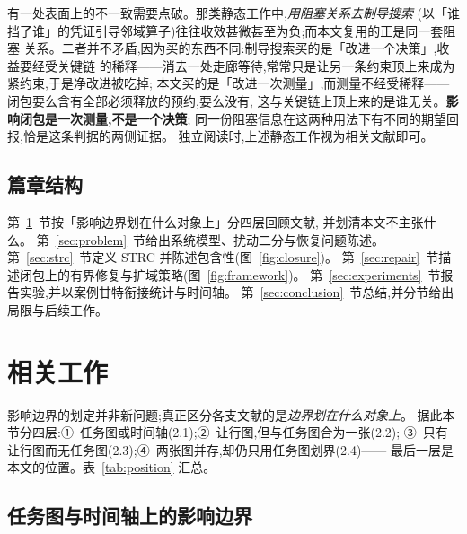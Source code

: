 \documentclass[manuscript,screen,review]{acmart}
\providecommand{\STRC}{\textsc{STRC}}
\begin{document}
有一处表面上的不一致需要点破。那类静态工作中,\emph{用阻塞关系去制导搜索}
(以「谁挡了谁」的凭证引导邻域算子)往往收效甚微甚至为负;而本文复用的正是同一套阻塞
关系。二者并不矛盾,因为买的东西不同:制导搜索买的是「改进一个决策」,收益要经受关键链
的稀释——消去一处走廊等待,常常只是让另一条约束顶上来成为紧约束,于是净改进被吃掉;
本文买的是「改进一次测量」,而测量不经受稀释——闭包要么含有全部必须释放的预约,要么没有,
这与关键链上顶上来的是谁无关。\textbf{影响闭包是一次测量,不是一个决策};
同一份阻塞信息在这两种用法下有不同的期望回报,恰是这条判据的两侧证据。
独立阅读时,上述静态工作视为相关文献即可。

\subsection{篇章结构}

第~\ref{sec:related_work}~节按「影响边界划在什么对象上」分四层回顾文献,
并划清本文不主张什么。
第~\ref{sec:problem}~节给出系统模型、扰动二分与恢复问题陈述。
第~\ref{sec:strc}~节定义 \STRC{} 并陈述包含性(图~\ref{fig:closure})。
第~\ref{sec:repair}~节描述闭包上的有界修复与扩域策略(图~\ref{fig:framework})。
第~\ref{sec:experiments}~节报告实验,并以案例甘特衔接统计与时间轴。
第~\ref{sec:conclusion}~节总结,并分节给出局限与后续工作。

\section{相关工作}
\label{sec:related_work}


影响边界的划定并非新问题;真正区分各支文献的是\emph{边界划在什么对象上}。
据此本节分四层:①~任务图或时间轴(2.1);②~让行图,但与任务图合为一张(2.2);
③~只有让行图而无任务图(2.3);④~两张图并存,却仍只用任务图划界(2.4)——
最后一层是本文的位置。表~\ref{tab:position} 汇总。

\subsection{任务图与时间轴上的影响边界}
\label{sec:rw_aor}
\end{document}
